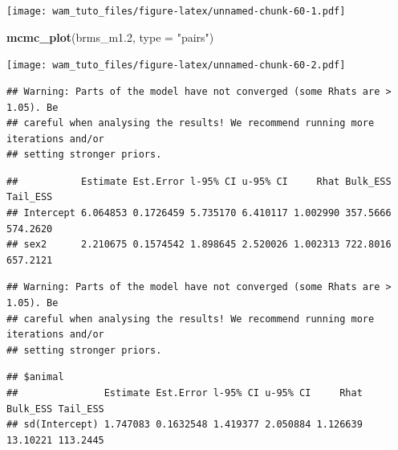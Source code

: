 \documentclass[
  12pt,
]{book}
\newenvironment{Shaded}{\begin{snugshade}}{\end{snugshade}}
\newcommand{\DataTypeTok}[1]{\textcolor[rgb]{0.13,0.29,0.53}{#1}}
\newcommand{\FloatTok}[1]{\textcolor[rgb]{0.00,0.00,0.81}{#1}}
\newcommand{\KeywordTok}[1]{\textcolor[rgb]{0.13,0.29,0.53}{\textbf{#1}}}
\newcommand{\NormalTok}[1]{#1}
\newcommand{\OperatorTok}[1]{\textcolor[rgb]{0.81,0.36,0.00}{\textbf{#1}}}
\newcommand{\StringTok}[1]{\textcolor[rgb]{0.31,0.60,0.02}{#1}}
\begin{document}
\texttt{[image: wam\_tuto\_files/figure-latex/unnamed-chunk-60-1.pdf]}

\begin{Shaded}
\begin{Highlighting}[]
\KeywordTok{mcmc\_plot}\NormalTok{(brms\_m1}\FloatTok{.2}\NormalTok{, }\DataTypeTok{type =} \StringTok{"pairs"}\NormalTok{)}
\end{Highlighting}
\end{Shaded}

\texttt{[image: wam\_tuto\_files/figure-latex/unnamed-chunk-60-2.pdf]}

\begin{Shaded}
\end{Shaded}

\begin{verbatim}
## Warning: Parts of the model have not converged (some Rhats are > 1.05). Be
## careful when analysing the results! We recommend running more iterations and/or
## setting stronger priors.
\end{verbatim}

\begin{verbatim}
##           Estimate Est.Error l-95% CI u-95% CI     Rhat Bulk_ESS Tail_ESS
## Intercept 6.064853 0.1726459 5.735170 6.410117 1.002990 357.5666 574.2620
## sex2      2.210675 0.1574542 1.898645 2.520026 1.002313 722.8016 657.2121
\end{verbatim}

\begin{Shaded}
\end{Shaded}

\begin{verbatim}
## Warning: Parts of the model have not converged (some Rhats are > 1.05). Be
## careful when analysing the results! We recommend running more iterations and/or
## setting stronger priors.
\end{verbatim}

\begin{verbatim}
## $animal
##               Estimate Est.Error l-95% CI u-95% CI     Rhat Bulk_ESS Tail_ESS
## sd(Intercept) 1.747083 0.1632548 1.419377 2.050884 1.126639 13.10221 113.2445
\end{verbatim}
\end{document}
